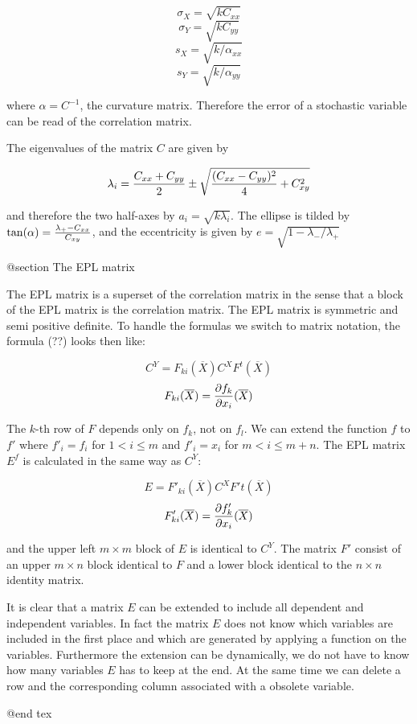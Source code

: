 $$ \sigma_{X}=\sqrt{k C_{xx}}        $$
$$ \sigma_{Y}=\sqrt{k C_{yy}}        $$
$$      s_{X}=\sqrt{k / \alpha_{xx}} $$
$$      s_{Y}=\sqrt{k / \alpha_{yy}} $$

where $\alpha=C^{-1}$, the curvature matrix. Therefore the error of
a stochastic variable can be read of the correlation matrix. 

The eigenvalues of the matrix $C$ are given by

$$\lambda_i={C_{xx}+C_{yy} \over 2 } \pm 
       \sqrt{{(C_{xx}-C_{yy})^2 \over 4} +C_{xy}^2  }$$

and therefore the two half-axes by $a_i=\sqrt{k\lambda_i}$. The
ellipse is tilded by $\tan(\alpha)={\lambda_{+}-C_{xx}\over C_{xy}}$,
and the eccentricity is given by $e=\sqrt{1-\lambda_{-}/\lambda_{+}}$

@section The EPL matrix

The EPL matrix is a superset of the correlation matrix in the sense
that a block of the EPL matrix is the correlation matrix. The EPL matrix
is symmetric and semi positive definite. To handle the formulas we 
switch to matrix notation, the formula (??) looks then like:

$$  C^{Y} = F_{ki}(\overline{X}) C^{X} F^{t}(\overline{X}) $$
$$  F_{ki}(\overline{X})= {\partial f_k \over \partial x_i}(\overline{X}) $$
 
The $k$-th row of $F$ depends only on $f_k$, not on
$f_l$. We can extend the function $f$ to $f'$ where
$f'_i=f_i$ for $1< i \le m$ and $f'_i=x_i$ for $m < i \le m+n$.
The EPL matrix $E^{f}$ is calculated in the same way as $C^{Y}$:

$$  E = F'_{ki}(\overline{X}) C^{X} F'{t}(\overline{X}) $$
$$  F'_{ki}(\overline{X})= {\partial f'_k \over \partial x_i}(\overline{X}) $$

and the upper left $m \times m $ block of $E$ is identical to $C^{Y}$. 
The matrix $F'$ consist of an upper $m \times n $ block identical to $F$
and a lower block identical to the $n \times n $ identity matrix.

It is clear that a matrix $E$ can be extended to include all dependent
and independent variables. In fact the matrix $E$ does not know which
variables are included in the first place and which are generated by
applying a function on the variables. Furthermore the extension can be 
dynamically, we do not have to know how many variables $E$ has to keep
at the end. At the same time we can delete a row and the corresponding
column associated with a  obsolete variable.

@end tex
